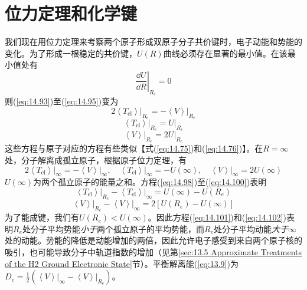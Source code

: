 \section{位力定理和化学键}
\label{sec:14.5 The Virial Theorem and Chemical Bonding}

    我们现在用位力定理来考察两个原子形成双原子分子共价键时，电子动能和势能的变化。为了形成一根稳定的共价键，$U\left(R\right)$曲线必须存在显著的最小值。在该最小值处有
    \begin{equation}
        \left. \frac{\dd U}{\dd R} \right|_{R_e} = 0
        \label{eq:14.96}
    \end{equation}
    则(\ref{eq:14.93})至(\ref{eq:14.95})变为
    \begin{equation}
        2 \left. \left\langle T_{\text{el}} \right\rangle \right|_{R_e} = - \left. \left\langle V \right\rangle \right|_{R_e}
        \label{eq:14.97}
    \end{equation}
    \begin{equation}
        \left. \left\langle T_{\text{el}} \right\rangle \right|_{R_e} = \left. U \right|_{R_e}
        \label{eq:14.98}
    \end{equation}
    \begin{equation}
        \left. \left\langle V \right\rangle \right|_{R_e} = 2 \left. U \right|_{R_e}
        \label{eq:14.99}
    \end{equation}
    这些方程与原子对应的方程有些类似【式(\ref{eq:14.75})和(\ref{eq:14.76})】。在$R = \infty$处，分子解离成孤立原子，根据原子位力定理，有
    \begin{equation}
        2 \left. \left\langle T_{\text{el}} \right\rangle \right|_{\infty} = - \left. \left\langle V \right\rangle \right|_{\infty}, \quad \left. \left\langle T_{\text{el}} \right\rangle \right|_{\infty} = -U\left(\infty\right), \quad \left. \left\langle V \right\rangle \right|_{\infty} = 2 U \left(\infty\right)
        \label{eq:14.100}
    \end{equation}
    $U \left(\infty\right)$为两个孤立原子的能量之和。方程(\ref{eq:14.98})至(\ref{eq:14.100})表明
    \begin{equation}
        \left. \left\langle T_{\text{el}} \right\rangle \right|_{R_e} - \left. \left\langle T_{\text{el}} \right\rangle \right|_{\infty} = U \left(\infty\right) - U \left(R_e\right)
        \label{eq:14.101}
    \end{equation}
    \begin{equation}
        \left. \left\langle V \right\rangle \right|_{R_e} - \left. \left\langle V \right\rangle \right|_{\infty} = 2 \left[U\left(R_e\right) - U\left(\infty\right)\right]
        \label{eq:14.102}
    \end{equation}
    为了能成键，我们有$U \left(R_e\right) < U\left(\infty\right)$。因此方程(\ref{eq:14.101})和(\ref{eq:14.102})表明$R_e$处分子平均势能\textit{小于}两个孤立原子的平均势能，而$R_e$处分子平均动能\textit{大于}$\infty$处的动能。势能的降低是动能增加的两倍，因此允许电子感受到来自两个原子核的吸引，也可能导致分子中轨道指数的增加（见第\ref{sec:13.5 Approximate Treatments of the H2 Ground Electronic State}节）。平衡解离能(\ref{eq:13.9})为$D_e = \frac{1}{2} \left(\left. \left\langle V \right\rangle\right|_{\infty} - \left.\left\langle V \right\rangle\right|_{R_e}\right)$。

